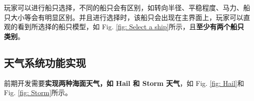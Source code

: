 \documentclass[a4paper,10pt]{article}
\begin{document}
		玩家可以进行船只选择，不同的船只会有区别，如转向半径、平稳程度、马力、船只大小等会有明显区别。并且进行选择时，该船只会出现在主界面上，玩家可以直观的看到所选择的船只模型，如 Fig. \ref{fig: Select a ship}所示，且\textbf{至少有两个船只类别}。
		
		\subsection{天气系统功能实现}
		
		前期开发需要\textbf{实现两种海面天气，如 Hail 和 Storm 天气}，如 Fig. \ref{fig: Hail}和 Fig. \ref{fig: Storm}所示。
		
		\begin{figure}[htbp] 
			\centering 
			

\end{figure}
\end{document}
